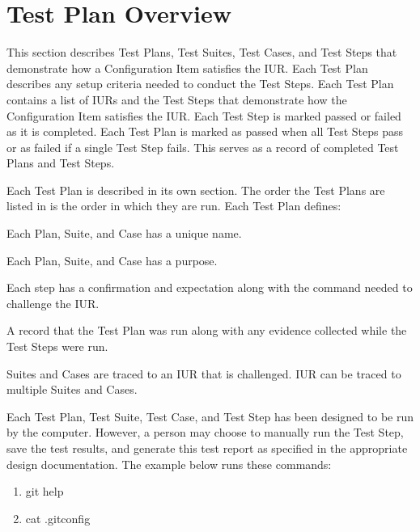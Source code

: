 \newpage
\section{Test Plan Overview}
This section describes Test Plans, Test Suites, Test Cases, and Test Steps that
demonstrate how a Configuration Item satisfies the IUR\@.  Each Test Plan
describes any setup criteria needed to conduct the Test Steps. Each Test Plan
contains a list of IURs and the Test Steps that demonstrate how
the Configuration Item satisfies the IUR\@. Each Test Step is marked passed or
failed as it is completed.  Each Test Plan is marked as passed when all Test Steps
pass or as failed if a single Test Step fails.  This serves as a record of
completed Test Plans and Test Steps.

Each Test Plan is described in its own section.  The order the Test Plans
are listed in is the order in which they are run.  Each Test Plan defines:

\begin{description}[labelindent=25pt, style=multiline, leftmargin=4.0cm]

\item[name]
  Each Plan, Suite, and Case has a unique name.

\item[purpose]
  Each Plan, Suite, and Case has a purpose.

\item[Test Steps]
  Each step has a confirmation and expectation along with the command needed to
  challenge the IUR\@.

\item[Objective Evidence]
  A record that the Test Plan was run along with any evidence collected while the
  Test Steps were run.

\item[Traceability]
  Suites and Cases are traced to an IUR that is challenged. IUR can be traced to
  multiple Suites and Cases.

\end{description}

Each Test Plan, Test Suite, Test Case, and Test Step has been designed to be
run by the computer. However, a person may choose to manually run the Test
Step, save the test results, and generate this test report as specified in the
appropriate design documentation.  The example below runs these commands:

\begin{enumerate}
  \item git help
  \item cat \@.gitconfig
\end{enumerate}


